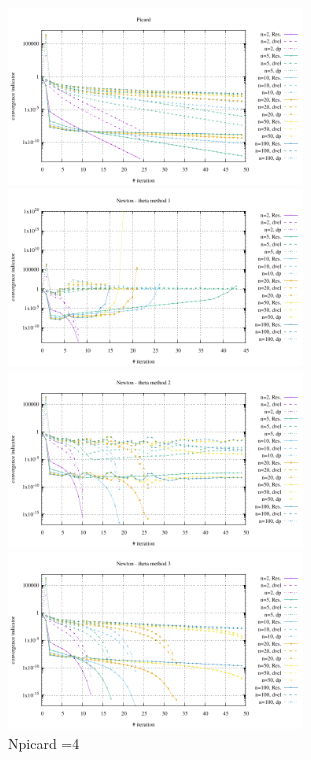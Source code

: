 \begin{center}
\includegraphics[width=7.8cm]{python_codes/fieldstone_87/results/experiment_09/conv_picard.pdf}
\includegraphics[width=7.8cm]{python_codes/fieldstone_87/results/experiment_09/conv_meth1.pdf}\\
\includegraphics[width=7.8cm]{python_codes/fieldstone_87/results/experiment_09/conv_meth2.pdf}
\includegraphics[width=7.8cm]{python_codes/fieldstone_87/results/experiment_09/conv_meth3.pdf}\\
{\captionfont Npicard =4}
\end{center}


